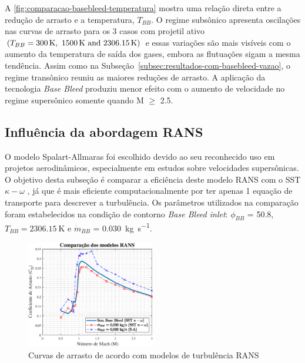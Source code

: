 A \autoref{fig:comparacao-basebleed-temperatura} mostra uma relação direta entre a redução de arrasto e a temperatura, \(T_{BB}\). O regime subsônico apresenta oscilações nas curvas de arrasto para os 3 casos com projetil ativo \(\left(T_{BB} = \qtylist{300;1500;2306,15}{\kelvin}\right)\) e essas variações são mais visíveis com o aumento da temperatura de saída dos gases, embora as flutuações sigam a mesma tendência. Assim como na Subseção~\ref{subsec:resultados-com-basebleed-vazao}, o regime transônico reuniu as maiores reduções de arrasto. A aplicação da tecnologia \textit{Base Bleed} produziu menor efeito com o aumento de velocidade no regime supersônico somente quando M \(\geq\) \num{2,5}.

\subsection{Influência da abordagem RANS}\label{subsec:resultados-com-basebleed-RANS}

O modelo Spalart-Allmaras \cite{Spalart1992} foi escolhido devido ao seu reconhecido uso em projetos aerodinâmicos, especialmente em estudos sobre velocidades supersônicas. O objetivo desta subseção é comparar a eficiência deste modelo RANS com o SST \(\kappa-\omega\) \cite{Menter1994TwoequationET,Menter2003,Menter2009}, já que é mais eficiente computacionalmente por ter apenas 1 equação de transporte para descrever a turbulência. Os parâmetros utilizados na comparação foram estabelecidos na condição de contorno \textit{Base Bleed inlet}: \(\phi_{BB}\) = \qty{50,8}{\millimetre}, \(T_{BB} = \qty{2306,15}{\kelvin}\) e \(\Dot{m}_{BB}\) = \qty{0,030}{\kilogram\per\second}.

\begin{figure}[!ht]
    \centering
    \includegraphics[width=0.5\textwidth]{cd-combasebleed-rans.eps}
 	\caption{Curvas de arrasto de acordo com modelos de turbulência RANS}
    \label{fig:comparacao-bb-rans}
\end{figure}

